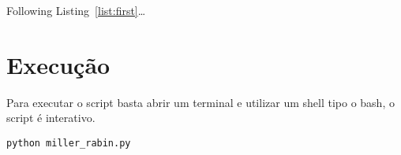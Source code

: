 \documentclass[a4paper,11pt]{article}
\theoremstyle{mytheor}
\begin{document}
Following Listing~\ref{list:first}\ldots{} 

\section*{Execução}

Para executar o script basta abrir um terminal e utilizar um shell tipo o bash, o script é interativo.

\begin{lstlisting}[label={list:second},caption=Executando o script.]
python miller_rabin.py
\end{lstlisting}
\end{document}
